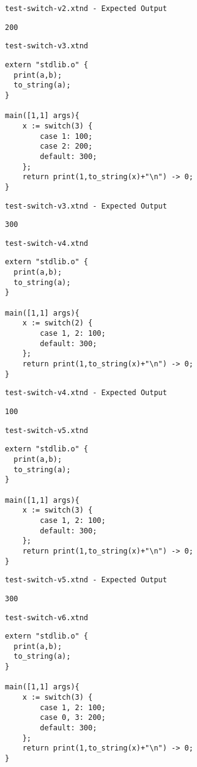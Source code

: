\medskip \noindent \texttt{test-switch-v2.xtnd - Expected Output}


\begin{lstlisting}
200
\end{lstlisting}


\medskip \noindent \texttt{test-switch-v3.xtnd}


\begin{lstlisting}
extern "stdlib.o" {
  print(a,b);
  to_string(a);
}

main([1,1] args){
	x := switch(3) {
		case 1: 100;
		case 2: 200;
		default: 300;
	};
	return print(1,to_string(x)+"\n") -> 0;
}
\end{lstlisting}


\medskip \noindent \texttt{test-switch-v3.xtnd - Expected Output}


\begin{lstlisting}
300
\end{lstlisting}


\medskip \noindent \texttt{test-switch-v4.xtnd}


\begin{lstlisting}
extern "stdlib.o" {
  print(a,b);
  to_string(a);
}

main([1,1] args){
	x := switch(2) {
		case 1, 2: 100;
		default: 300;
	};
	return print(1,to_string(x)+"\n") -> 0;
}
\end{lstlisting}


\medskip \noindent \texttt{test-switch-v4.xtnd - Expected Output}


\begin{lstlisting}
100
\end{lstlisting}


\medskip \noindent \texttt{test-switch-v5.xtnd}


\begin{lstlisting}
extern "stdlib.o" {
  print(a,b);
  to_string(a);
}

main([1,1] args){
	x := switch(3) {
		case 1, 2: 100;
		default: 300;
	};
	return print(1,to_string(x)+"\n") -> 0;
}
\end{lstlisting}


\medskip \noindent \texttt{test-switch-v5.xtnd - Expected Output}


\begin{lstlisting}
300
\end{lstlisting}


\medskip \noindent \texttt{test-switch-v6.xtnd}


\begin{lstlisting}
extern "stdlib.o" {
  print(a,b);
  to_string(a);
}

main([1,1] args){
	x := switch(3) {
		case 1, 2: 100;
		case 0, 3: 200;
		default: 300;
	};
	return print(1,to_string(x)+"\n") -> 0;
}
\end{lstlisting}



